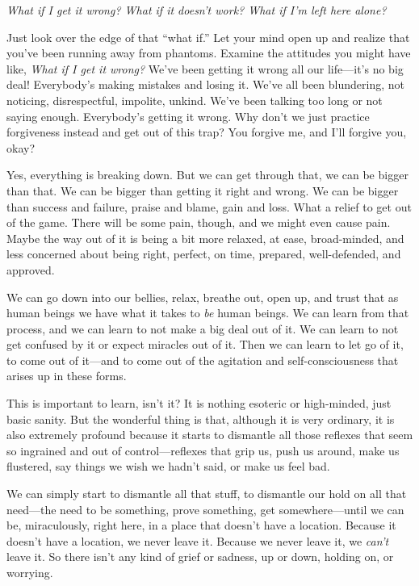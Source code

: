 
\emph{What if I get it wrong? What if it doesn't work? What if I'm left 
here alone?}

Just look over the edge of that ``what if.'' Let your mind open up and 
realize that you've been running away from phantoms. Examine the 
attitudes you might have like, \emph{What if I get it wrong?} We've 
been getting it wrong all our life---it's no big deal! Everybody's 
making mistakes and losing it. We've all been blundering, not noticing, 
disrespectful, impolite, unkind. We've been talking too long or not 
saying enough. Everybody's getting it wrong. Why don't we just practice 
forgiveness instead and get out of this trap? You forgive me, and I'll 
forgive you, okay?

Yes, everything is breaking down. But we can get through that, we can 
be bigger than that. We can be bigger than getting it right and wrong. 
We can be bigger than success and failure, praise and blame, gain and 
loss. What a relief to get out of the game. There will be some pain, 
though, and we might even cause pain. Maybe the way out of it is being 
a bit more relaxed, at ease, broad-minded, and less concerned about 
being right, perfect, on time, prepared, well-defended, and approved.

We can go down into our bellies, relax, breathe out, open up, and trust 
that as human beings we have what it takes to \emph{be} human beings. 
We can learn from that process, and we can learn to not make a big deal 
out of it. We can learn to not get confused by it or expect miracles 
out of it. Then we can learn to let go of it, to come out of it---and 
to come out of the agitation and self-consciousness that arises up in 
these forms.

This is important to learn, isn't it? It is nothing esoteric or 
high-minded, just basic sanity. But the wonderful thing is that, 
although it is very ordinary, it is also extremely profound because it 
starts to dismantle all those reflexes that seem so ingrained and out 
of control---reflexes that grip us, push us around, make us flustered, 
say things we wish we hadn't said, or make us feel bad.

We can simply start to dismantle all that stuff, to dismantle our hold 
on all that need---the need to be something, prove something, get 
somewhere---until we can be, miraculously, right here, in a place that 
doesn't have a location. Because it doesn't have a location, we never 
leave it. Because we never leave it, we \emph{can't} leave it. So there 
isn't any kind of grief or sadness, up or down, holding on, or worrying.

